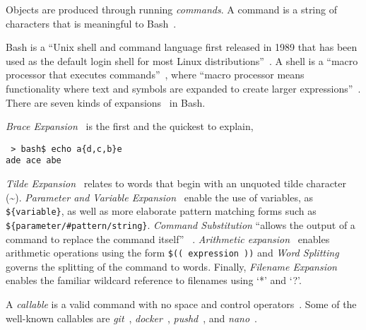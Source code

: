 Objects are produced through running \emph{commands}. A command is a string of characters that is meaningful to Bash~\cite{gnu_bash}. 

Bash is a \enquote{Unix shell and command language first released in 1989 that has been used as the default login shell for most Linux distributions}~\cite{bash}. A shell is a \enquote{macro processor that executes commands}~\cite{bash_manual}, where \enquote{macro processor means functionality where text and symbols are expanded to create larger expressions}~\cite{bash_manual}. There are seven kinds of expansions~\cite{bash_expansions_ref} in Bash.

\emph{Brace Expansion}~\cite{brace_expansion} is the first and the quickest to explain,
%
\begin{verbatim}
 > bash$ echo a{d,c,b}e
ade ace abe
\end{verbatim}
%
\emph{Tilde Expansion}~\cite{tilde_expansion} relates to words that begin with an unquoted tilde character (\textasciitilde). \emph{Parameter and Variable Expansion}~\cite{shell_parameter_expansion} enable the use of variables, as \texttt{\$\{variable\}}, as well as more elaborate pattern matching forms such as \texttt{\$\{parameter/\#pattern/string\}}. \emph{Command Substitution} \enquote{allows the output of a command to replace the command itself} ~\cite{command_substitution}. \emph{Arithmetic expansion}~\cite{arithmetic_expansion} enables arithmetic operations using the form \texttt{\$(( expression ))} and \emph{Word Splitting}~\cite{word_splitting} governs the splitting of the command to words. Finally, \emph{Filename Expansion}~\cite{filename_expansion} enables the familiar wildcard reference to filenames using `*' and `?'.

A \emph{callable} is a valid command with no space and control operators~\cite{control_operators}. Some of the well-known callables are \emph{git}~\cite{git}, \emph{docker}~\cite{docker}, \emph{pushd}~\cite{pushd}, and \emph{nano}~\cite{nano}. 


